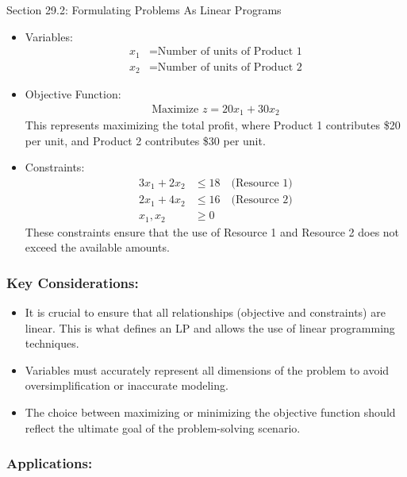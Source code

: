 \begin{notes}{Section 29.2: Formulating Problems As Linear Programs}
\begin{highlight}
        \begin{itemize}
            \item Variables:
            \begin{align*}
            x_1 &= \text{Number of units of Product 1} \\
            x_2 &= \text{Number of units of Product 2}
            \end{align*}
            \item Objective Function:
            \begin{align*}
            \text{Maximize } z = 20x_1 + 30x_2
            \end{align*}
            This represents maximizing the total profit, where Product 1 contributes \$20 per unit, and Product 2 contributes \$30 per unit.
            \item Constraints:
            \begin{align*}
            3x_1 + 2x_2 &\leq 18 \quad \text{(Resource 1)} \\
            2x_1 + 4x_2 &\leq 16 \quad \text{(Resource 2)} \\
            x_1, x_2 &\geq 0
            \end{align*}
            These constraints ensure that the use of Resource 1 and Resource 2 does not exceed the available amounts.
        \end{itemize}
    \end{highlight}
    
    \subsubsection*{Key Considerations:}
    
    \begin{itemize}
        \item It is crucial to ensure that all relationships (objective and constraints) are linear. This is what defines an LP and allows the use of linear programming techniques.
        \item Variables must accurately represent all dimensions of the problem to avoid oversimplification or inaccurate modeling.
        \item The choice between maximizing or minimizing the objective function should reflect the ultimate goal of the problem-solving scenario.
    \end{itemize}
    
    \subsubsection*{Applications:}
    

\end{notes}
